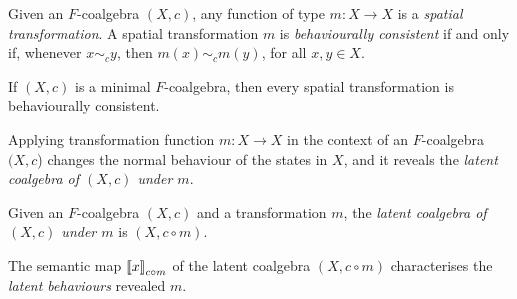 \begin{definition}
Given an $F$-coalgebra $(X,c)$, any function of type $m\colon X\rightarrow X$ is a \emph{spatial transformation}. %
A spatial transformation $m$ is \emph{behaviourally consistent} if and only if, whenever $x\sim_c y$, then $m(x)\sim_{c} m(y)$, for all $x,y \in X$. %
\end{definition}
\begin{corollary}
    If $(X,c)$ is a minimal $F$-coalgebra, then every spatial transformation %
    is behaviourally consistent. %
\end{corollary}
Applying transformation function $m\colon X\rightarrow X$ in the context of an $F$-coalgebra $(X,c$) changes the normal behaviour of the states in $X$, and it reveals the \emph{latent coalgebra of $(X,c)$ under $m$}. 
\begin{definition}
Given an $F$-coalgebra $(X,c)$ and a transformation $m$, the \emph{latent coalgebra of $(X,c)$ under $m$} is $(X,c\circ m)$. 
\end{definition}
The semantic map ${{\llbracket x\rrbracket}}_{{c\circ m}}$ of the latent coalgebra $(X,c\circ m)$ characterises the \emph{latent behaviours} revealed $m$. 

